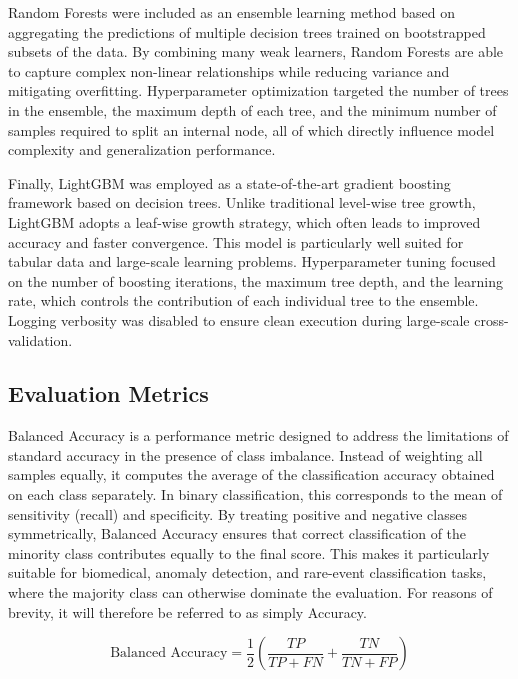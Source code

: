 \documentclass[en]{dimscthesis}
\begin{document}
Random Forests were included as an ensemble learning method based on aggregating the predictions of multiple decision trees trained on bootstrapped subsets of the data. By combining many weak learners, Random Forests are able to capture complex non-linear relationships while reducing variance and mitigating overfitting. Hyperparameter optimization targeted the number of trees in the ensemble, the maximum depth of each tree, and the minimum number of samples required to split an internal node, all of which directly influence model complexity and generalization performance.

Finally, LightGBM was employed as a state-of-the-art gradient boosting framework based on decision trees. Unlike traditional level-wise tree growth, LightGBM adopts a leaf-wise growth strategy, which often leads to improved accuracy and faster convergence. This model is particularly well suited for tabular data and large-scale learning problems. Hyperparameter tuning focused on the number of boosting iterations, the maximum tree depth, and the learning rate, which controls the contribution of each individual tree to the ensemble. Logging verbosity was disabled to ensure clean execution during large-scale cross-validation.

\subsection{Evaluation Metrics} \label{eval_metr}

Balanced Accuracy is a performance metric designed to address the limitations of standard accuracy in the presence of class imbalance. Instead of weighting all samples equally, it computes the average of the classification accuracy obtained on each class separately. In binary classification, this corresponds to the mean of sensitivity (recall) and specificity. By treating positive and negative classes symmetrically, Balanced Accuracy ensures that correct classification of the minority class contributes equally to the final score. This makes it particularly suitable for biomedical, anomaly detection, and rare-event classification tasks, where the majority class can otherwise dominate the evaluation. For reasons of brevity, it will therefore be referred to as simply Accuracy.

\begin{equation}
	\text{Balanced Accuracy}
	= \frac{1}{2}
	\left(
	\frac{TP}{TP + FN}
	+
	\frac{TN}{TN + FP}
	\right)
\end{equation}
\end{document}
